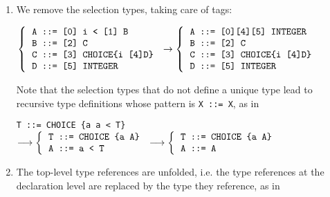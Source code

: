 \begin{enumerate}

  \item \label{selection} We remove the selection types, taking care
  of tags:

        \begin{center}
        {\small
          $\left\{
             \begin{tabular}{l}
                \verb+A ::= [0] i < [1] B+\\
                \verb+B ::= [2] C+\\
                \verb+C ::= [3] CHOICE{i [4]D}+\\
                \verb+D ::= [5] INTEGER+
             \end{tabular}
            \right.
          \rightarrow
          \left\{
               \begin{tabular}{l}
                  \verb+A ::= [0][4][5] INTEGER+\\
                  \verb+B ::= [2] C+\\
                  \verb+C ::= [3] CHOICE{i [4]D}+\\
                  \verb+D ::= [5] INTEGER+
               \end{tabular}
             \right.$
        }
        \end{center}

        Note that the selection types that do not define a unique type
        lead to recursive type definitions whose pattern is
        \texttt{\small X ::= X}, as in

        \begin{center}
        {\small 
        \verb+T ::= CHOICE {a a < T}+\\
        $\longrightarrow
         \left\{
            \begin{tabular}{l}
               \verb+T ::= CHOICE {a A}+\\
               \verb+A ::= a < T+
            \end{tabular}
          \right.
         \longrightarrow
         \left\{
             \begin{tabular}{l}
                \verb+T ::= CHOICE {a A}+\\
                \verb+A ::= A+
             \end{tabular}
          \right.$
        }
        \end{center}

  \item \label{type_references}
        The top-level type references are unfolded, i.e. the type
        references at the declaration level are replaced by the type
        they reference, as in


\end{enumerate}
